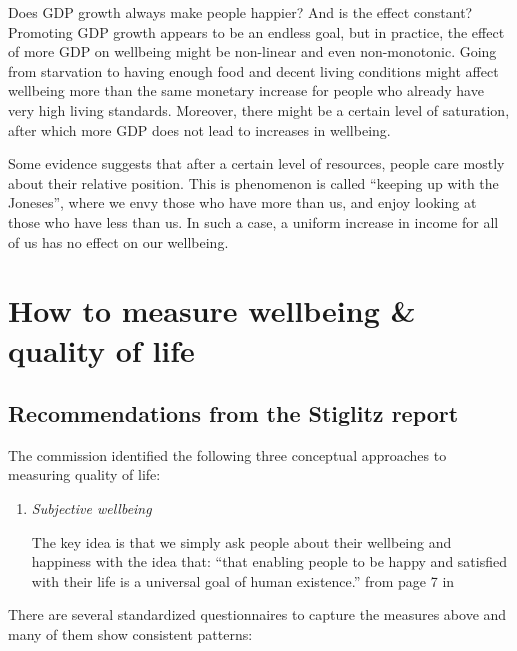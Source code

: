 \documentclass[
]{book}
\begin{document}
\begin{enumerate}
  Does GDP growth always make people happier? And is the effect constant? Promoting GDP growth appears to be an endless goal, but in practice, the effect of more GDP on wellbeing might be non-linear and even non-monotonic. Going from starvation to having enough food and decent living conditions might affect wellbeing more than the same monetary increase for people who already have very high living standards. Moreover, there might be a certain level of saturation, after which more GDP does not lead to increases in wellbeing.

  Some evidence suggests that after a certain level of resources, people care mostly about their relative position. This is phenomenon is called ``keeping up with the Joneses'', where we envy those who have more than us, and enjoy looking at those who have less than us. In such a case, a uniform increase in income for all of us has no effect on our wellbeing.
\end{enumerate}

\hypertarget{how-to-measure-wellbeing-quality-of-life}{%
\section{How to measure wellbeing \& quality of life}\label{how-to-measure-wellbeing-quality-of-life}}

\hypertarget{recommendations-from-the-stiglitz-report}{%
\subsection*{Recommendations from the Stiglitz report}\label{recommendations-from-the-stiglitz-report}}

The commission identified the following three conceptual approaches to measuring quality of life:

\begin{enumerate}
\def\labelenumi{\arabic{enumi}.}
\item
  \emph{Subjective wellbeing}

  The key idea is that we simply ask people about their wellbeing and happiness with the idea that: ``that enabling people to be happy and satisfied with their life is a universal goal of human existence.'' from page 7 in \citep{stiglitz2010report}
\end{enumerate}

There are several standardized questionnaires to capture the measures above and many of them show consistent patterns:
\end{document}
